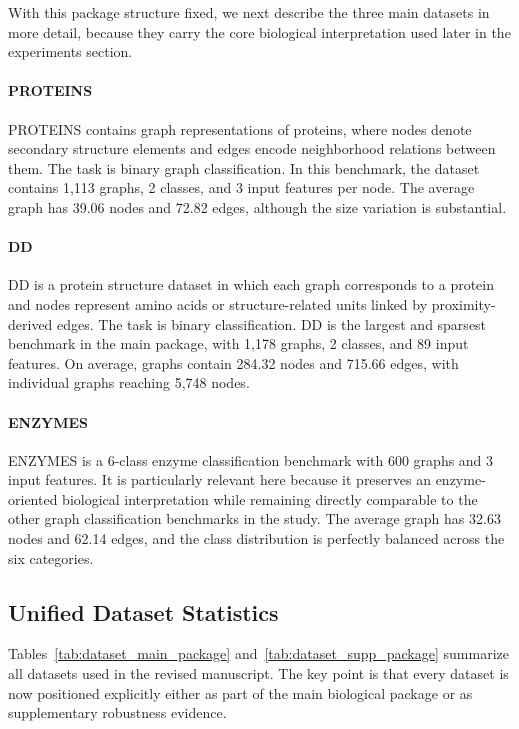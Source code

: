 With this package structure fixed, we next describe the three main datasets in more detail, because they carry the core biological interpretation used later in the experiments section.

\paragraph{PROTEINS}
PROTEINS contains graph representations of proteins, where nodes denote secondary structure elements and edges encode neighborhood relations between them. The task is binary graph classification. In this benchmark, the dataset contains 1,113 graphs, 2 classes, and 3 input features per node. The average graph has 39.06 nodes and 72.82 edges, although the size variation is substantial.

\paragraph{DD}
DD is a protein structure dataset in which each graph corresponds to a protein and nodes represent amino acids or structure-related units linked by proximity-derived edges. The task is binary classification. DD is the largest and sparsest benchmark in the main package, with 1,178 graphs, 2 classes, and 89 input features. On average, graphs contain 284.32 nodes and 715.66 edges, with individual graphs reaching 5,748 nodes.

\paragraph{ENZYMES}
ENZYMES is a 6-class enzyme classification benchmark with 600 graphs and 3 input features. It is particularly relevant here because it preserves an enzyme-oriented biological interpretation while remaining directly comparable to the other graph classification benchmarks in the study. The average graph has 32.63 nodes and 62.14 edges, and the class distribution is perfectly balanced across the six categories.

\subsection{Unified Dataset Statistics}

Tables~\ref{tab:dataset_main_package} and~\ref{tab:dataset_supp_package} summarize all datasets used in the revised manuscript. The key point is that every dataset is now positioned explicitly either as part of the main biological package or as supplementary robustness evidence.

